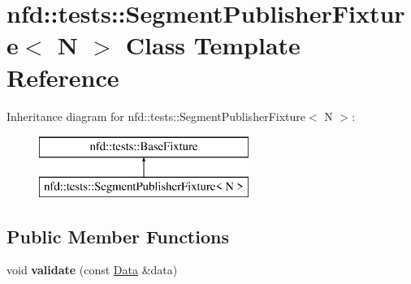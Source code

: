 \hypertarget{classnfd_1_1tests_1_1SegmentPublisherFixture}{}\section{nfd\+:\+:tests\+:\+:Segment\+Publisher\+Fixture$<$ N $>$ Class Template Reference}
\label{classnfd_1_1tests_1_1SegmentPublisherFixture}
Inheritance diagram for nfd\+:\+:tests\+:\+:Segment\+Publisher\+Fixture$<$ N $>$\+:\begin{figure}[H]
\begin{center}
\leavevmode
\includegraphics[height=2.000000cm]{classnfd_1_1tests_1_1SegmentPublisherFixture}
\end{center}
\end{figure}
\subsection*{Public Member Functions}
\begin{DoxyCompactItemize}
\item 
void {\bfseries validate} (const \hyperlink{classndn_1_1Data}{Data} \&data)\hypertarget{classnfd_1_1tests_1_1SegmentPublisherFixture_aaf0f124cb2006413ae3ffc2ca86e2577}{}\label{classnfd_1_1tests_1_1SegmentPublisherFixture_aaf0f124cb2006413ae3ffc2ca86e2577}

\end{DoxyCompactItemize}
